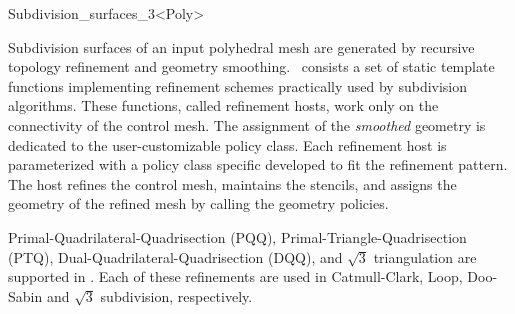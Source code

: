 
\ccRefPageBegin



\begin{ccRefClass}{Subdivision_surfaces_3<Poly>}

\ccDefinition

Subdivision surfaces of an input polyhedral mesh
are generated by recursive topology refinement and geometry
smoothing. \ccClassTemplateName\ consists a set of static 
template functions implementing refinement schemes 
practically used by subdivision algorithms. These functions,
called refinement hosts, work only on the connectivity of the
control mesh. The assignment of
the \emph{smoothed} geometry is dedicated to the user-customizable
policy class. Each refinement host is parameterized with a 
policy class specific developed to fit the refinement pattern.
The host refines the control mesh, maintains the stencils, and assigns the 
geometry of the refined mesh by calling the geometry policies.

Primal-Quadrilateral-Quadrisection (PQQ), Primal-Triangle-Quadrisection 
(PTQ), Dual-Quadrilateral-Quadrisection (DQQ), and $\sqrt{3}$ triangulation
are supported in \ccClassTemplateName . Each of these refinements are used in 
Catmull-Clark, Loop, Doo-Sabin and $\sqrt{3}$ subdivision, respectively. 




\end{ccRefClass}
